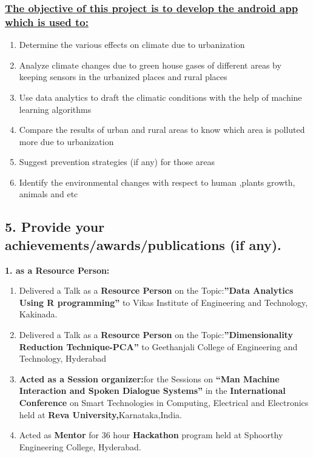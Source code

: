 \documentclass{article}
\begin{document}
\subsubsection*{\underline{The objective of this project is to \textbf{develop the android app }which is used to:}}
\begin{enumerate}
 \item Determine the various effects on climate due to urbanization
 \item Analyze climate changes due to green house gases of different areas by keeping sensors in the urbanized
places and rural places
\item Use data analytics to draft the climatic conditions with the help of machine learning algorithms
\item Compare the results of urban and rural areas to know which area is polluted more due to urbanization
\item Suggest prevention strategies (if any) for those areas
\item Identify the environmental changes with respect to human ,plants growth, animals and etc
\end{enumerate}

\subsection*{5. Provide your achievements/awards/publications (if any).}
\textbf{1. as a Resource Person:}
\hspace{0.5cm}
\begin{enumerate}
 \item Delivered a Talk as a \textbf{Resource Person }on the Topic:\textbf{”Data Analytics Using R programming” }to Vikas
Institute of Engineering and Technology, Kakinada.

\item Delivered a Talk as a \textbf{Resource Person }on the Topic:\textbf{”Dimensionality Reduction Technique-PCA” }to
Geethanjali College of Engineering and Technology, Hyderabad

\item \textbf{Acted as a Session organizer:}for the Sessions on \textbf{“Man Machine Interaction and Spoken Dialogue
Systems” }in the \textbf{International Conference }on Smart Technologies in Computing, Electrical and
Electronics held at \textbf{Reva University,}Karnataka,India.

\item Acted as \textbf{Mentor }for 36 hour \textbf{Hackathon }program held at Sphoorthy Engineering College, Hyderabad.
\end{enumerate}
\clearpage
\end{document}
